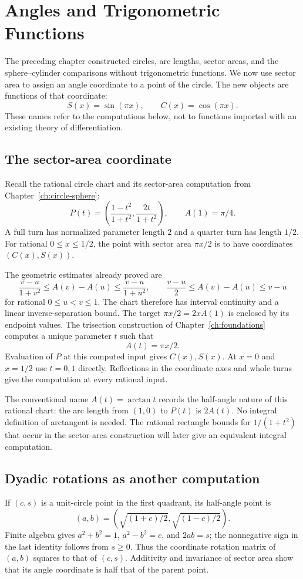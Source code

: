 \chapter{Angles and Trigonometric Functions}\label{ch:rational-circle-trigonometry}

The preceding chapter constructed circles, arc lengths, sector areas, and
the sphere--cylinder comparisons without trigonometric functions.  We now
use sector area to assign an angle coordinate to a point of the circle.
The new objects are functions of that coordinate:
\[
 S(x)=\sin(\pi x),\qquad C(x)=\cos(\pi x).
\]
These names refer to the computations below, not to functions imported
with an existing theory of differentiation.

\section{The sector-area coordinate}
\label{sec:sector-angle-coordinate}
Recall the rational circle chart and its sector-area computation from
Chapter~\ref{ch:circle-sphere}:
\[
 P(t)=\left(\frac{1-t^2}{1+t^2},\frac{2t}{1+t^2}\right),
 \qquad A(1)=\pi/4.
\]
A full turn has normalized parameter length $2$ and a quarter turn has
length $1/2$.  For rational $0\le x\le1/2$, the point with sector area
$\pi x/2$ is to have coordinates $(C(x),S(x))$.

The geometric estimates already proved are
\[
 \frac{v-u}{1+v^2}\le A(v)-A(u)\le\frac{v-u}{1+u^2},
 \qquad \frac{v-u}{2}\le A(v)-A(u)\le v-u
\]
for rational $0\le u<v\le1$.  The chart therefore has interval
continuity and a linear inverse-separation bound.  The target
$\pi x/2=2xA(1)$ is enclosed by its endpoint values.  The trisection
construction of Chapter~\ref{ch:foundations} computes a unique parameter
$t$ such that
\[
 A(t)=\pi x/2.
\]
Evaluation of $P$ at this computed input gives $C(x),S(x)$.  At $x=0$
and $x=1/2$ use $t=0,1$ directly.  Reflections in the coordinate axes and
whole turns give the computation at every rational input.

The conventional name $A(t)=\arctan t$ records the half-angle nature of
this rational chart: the arc length from $(1,0)$ to $P(t)$ is $2A(t)$.
No integral definition of arctangent is needed.  The rational rectangle
bounds for $1/(1+t^2)$ that occur in the sector-area construction will
later give an equivalent integral computation.

\section{Dyadic rotations as another computation}
\label{thm:finite-quarter-turn}
If $(c,s)$ is a unit-circle point in the first quadrant, its half-angle
point is
\[
 (a,b)=\left(\sqrt{(1+c)/2},\sqrt{(1-c)/2}\right).
\]
Finite algebra gives $a^2+b^2=1$, $a^2-b^2=c$, and $2ab=s$; the
nonnegative sign in the last identity follows from $s\ge0$.  Thus the
coordinate rotation matrix of $(a,b)$ squares to that of $(c,s)$.
Additivity and invariance of sector area show that its angle coordinate
is half that of the parent point.

